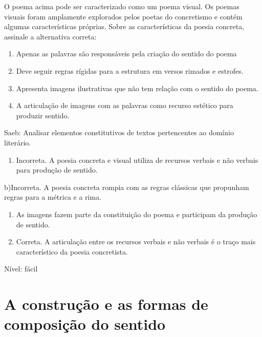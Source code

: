 {O poema acima pode ser caracterizado como um poema visual. Os poemas
visuais foram amplamente explorados pelos poetas do concretismo e contém
algumas características próprias. Sobre as características da poesia
concreta, assinale a alternativa correta:

\begin{enumerate}
\def\labelenumi{\arabic{enumi}.}
\item
  Apenas as palavras são responsáveis pela criação do sentido do poema
\item
  Deve seguir regras rígidas para a estrutura em versos rimados e
  estrofes.
\item
  Apresenta imagens ilustrativas que não tem relação com o sentido do
  poema.
\item
  A articulação de imagens com as palavras como recurso estético para
  produzir sentido.
\end{enumerate}

Saeb: Analisar elementos constitutivos de textos pertencentes ao domínio
literário.

\begin{enumerate}
\def\labelenumi{\arabic{enumi}.}
\tightlist
\item
  Incorreta. A poesia concreta e visual utiliza de recursos verbais e
  não verbais para produção de sentido.
\end{enumerate}

b)Incorreta. A poesia concreta rompia com as regras clássicas que
propunham regras para a métrica e a rima.

\begin{enumerate}
\def\labelenumi{\arabic{enumi}.}
\item
  As imagens fazem parte da constituição do poema e participam da
  produção de sentido.
\item
  Correta. A articulação entre os recursos verbais e não verbais é o
  traço mais característico da poesia concretista.
\end{enumerate}

Nível: fácil


\chapter{A construção e as formas de composição do sentido}


\begin{itemize}
  

\end{itemize}}
